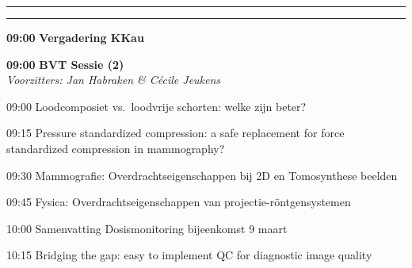 \documentclass[a4paper,10pt]{report}
\begin{document}
\begin{multicols*}{3}

\vfill\vspace{5cm}\strut


\columnbreak
\hrule\vspace{2mm}
\vspace{2mm}\hrule\strut

\begin{packed_enum}
\item[\textbf{09:00}] \textbf{Vergadering KKau}
\end{packed_enum} %

\vfill

\begin{packed_enum}
\item[\textbf{09:00}] \textbf{BVT Sessie (2)}\\\textit{Voorzitters: Jan Habraken \& C\'ecile Jeukens}
\item[09:00] Loodcomposiet vs.\ loodvrije schorten: welke zijn beter? 
\item[09:15] Pressure standardized compression: a safe replacement for force standardized compression in mammography? 
\item[09:30] Mammografie: Overdrachtseigenschappen bij 2D en Tomosynthese beelden 
\item[09:45] Fysica: Overdrachtseigenschappen van projectie-rönt\-gen\-systemen
\item[10:00] Samenvatting Dosismonitoring bijeenkomst 9 maart
\item[10:15] Bridging the gap: easy to implement QC for diagnostic image quality 
\end{packed_enum} %

\vfill


\end{multicols*}
\end{document}
